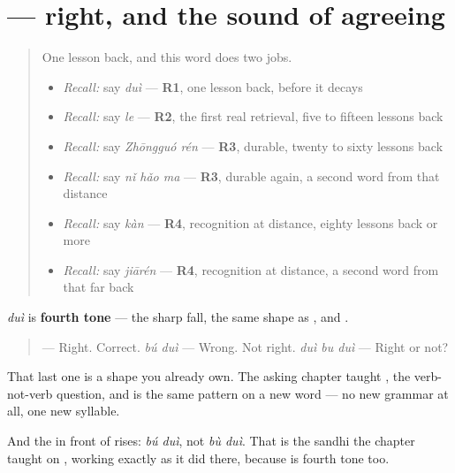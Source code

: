 \section[\texorpdfstring{\zh{对} (duì)}{对 (duì)}]{ — right, and the sound of agreeing}

\label{lesson:ZH-C26-dui}



\begin{quote}
One lesson back, and this word does two jobs.

\begin{itemize}
\raggedright
  \item \emph{Recall:} say \emph{duì} — \textbf{R1}, one lesson back, before it decays
  \item \emph{Recall:} say \emph{le} — \textbf{R2}, the first real retrieval, five to fifteen lessons back
  \item \emph{Recall:} say \emph{Zhōngguó rén} — \textbf{R3}, durable, twenty to sixty lessons back
  \item \emph{Recall:} say \emph{nǐ hǎo ma} — \textbf{R3}, durable again, a second word from that distance
  \item \emph{Recall:} say \emph{kàn} — \textbf{R4}, recognition at distance, eighty lessons back or more
  \item \emph{Recall:} say \emph{jiārén} — \textbf{R4}, recognition at distance, a second word from that far back
\end{itemize}
\end{quote}

\begin{sounds}
\textbf{} \emph{duì} is \textbf{fourth tone} — the sharp fall, the same shape as ,  and .

\begin{quote}
\textbf{} — Right. Correct. \textbf{} \emph{bú duì} — Wrong. Not right. \textbf{} \emph{duì bu duì} — Right or not?
\end{quote}

That last one is a shape you already own. The asking chapter taught \textbf{}, the verb-not-verb question, and \textbf{} is the same pattern on a new word — no new grammar at all, one new syllable.

And the  in front of  rises: \emph{bú duì}, not \emph{bù duì}. That is the  sandhi the  chapter taught on , working exactly as it did there, because  is fourth tone too.
\end{sounds}

